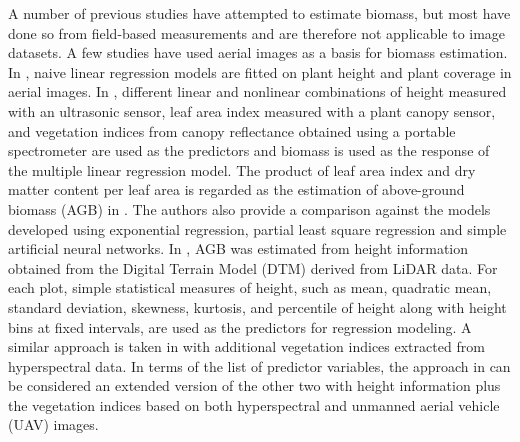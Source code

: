 \documentclass[10pt,twocolumn,letterpaper]{article}
\begin{document}

A number of previous studies have attempted to estimate biomass, but most have done so from field-based measurements and are therefore not applicable to image datasets. A few studies have used aerial images as a basis for biomass estimation. In \cite{schirrmann2016}, naive linear regression models are fitted on plant height and plant coverage in aerial images. In \cite{reddersen2014}, different linear and nonlinear combinations of height measured with an ultrasonic sensor, leaf area index measured with a plant canopy sensor, and vegetation indices from canopy reflectance obtained using a portable spectrometer are used as the predictors and biomass is used as the response of the multiple linear regression model. The product of leaf area index and dry matter content per leaf area is regarded as the estimation of above-ground biomass (AGB) in \cite{radiative2017}. The authors also provide a comparison against the models developed using exponential regression, partial least square regression and simple artificial neural networks. In \cite{laurin2016}, AGB was estimated from height information obtained from the Digital Terrain Model (DTM) derived from LiDAR data. For each plot, simple statistical measures of height, such as mean, quadratic mean, standard deviation, skewness, kurtosis, and percentile of height along with height bins at fixed intervals, are used as the predictors for regression modeling. A similar approach is taken in \cite{laurin2014} with additional vegetation indices extracted from hyperspectral data. In terms of the list of predictor variables, the approach in \cite{bendig2015} can be considered an extended version of the other two \cite{laurin2014, laurin2016} with height information plus the vegetation indices based on both hyperspectral and unmanned aerial vehicle (UAV) images.
\end{document}
